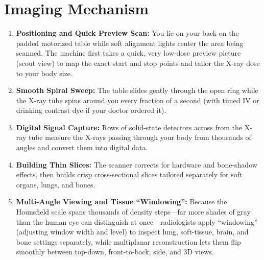 \section{Imaging Mechanism}
\begin{enumerate}
    \item \textbf{Positioning and Quick Preview Scan:} You lie on your back on the padded motorized table while soft alignment lights center the area being scanned. The machine first takes a quick, very low-dose preview picture (scout view) to map the exact start and stop points and tailor the X-ray dose to your body size.
    \item \textbf{Smooth Spiral Sweep:} The table slides gently through the open ring while the X-ray tube spins around you every fraction of a second (with timed IV or drinking contrast dye if your doctor ordered it).
    \item \textbf{Digital Signal Capture:} Rows of solid-state detectors across from the X-ray tube measure the X-rays passing through your body from thousands of angles and convert them into digital data.
    \item \textbf{Building Thin Slices:} The scanner corrects for hardware and bone-shadow effects, then builds crisp cross-sectional slices tailored separately for soft organs, lungs, and bones.
    \item \textbf{Multi-Angle Viewing and Tissue ``Windowing'':} Because the Hounsfield scale spans thousands of density steps---far more shades of gray than the human eye can distinguish at once---radiologists apply ``windowing'' (adjusting window width and level) to inspect lung, soft-tissue, brain, and bone settings separately, while multiplanar reconstruction lets them flip smoothly between top-down, front-to-back, side, and 3D views.
\end{enumerate}

